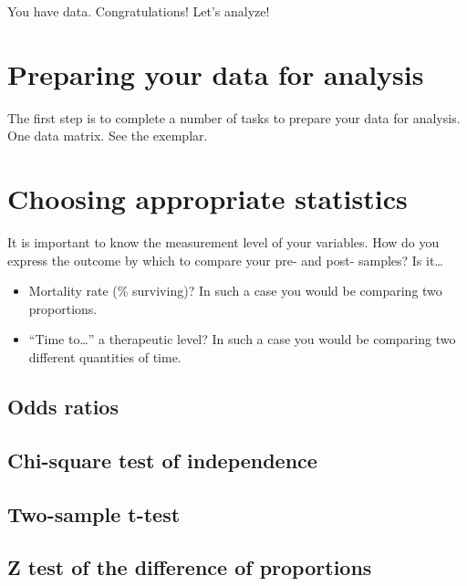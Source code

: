 \documentclass[
]{report}
\providecommand{\tightlist}{%
  \setlength{\itemsep}{0pt}\setlength{\parskip}{0pt}}
\begin{document}
You have data. Congratulations! Let's analyze!

\hypertarget{preparing-your-data-for-analysis}{%
\section{Preparing your data for
analysis}\label{preparing-your-data-for-analysis}}

The first step is to complete a number of tasks to prepare your data for
analysis. One data matrix. See the exemplar.

\hypertarget{choosing-appropriate-statistics}{%
\section{Choosing appropriate
statistics}\label{choosing-appropriate-statistics}}

It is important to know the measurement level of your variables. How do
you express the outcome by which to compare your pre- and post- samples?
Is it\ldots{}

\begin{itemize}
\tightlist
\item
  Mortality rate (\% surviving)? In such a case you would be comparing
  two proportions.
\item
  ``Time to\ldots{}'' a therapeutic level? In such a case you would be
  comparing two different quantities of time.
\end{itemize}

\hypertarget{odds-ratios}{%
\subsection{Odds ratios}\label{odds-ratios}}

\hypertarget{chi-square-test-of-independence}{%
\subsection{Chi-square test of
independence}\label{chi-square-test-of-independence}}

\hypertarget{two-sample-t-test}{%
\subsection{Two-sample t-test}\label{two-sample-t-test}}

\hypertarget{z-test-of-the-difference-of-proportions}{%
\subsection{Z test of the difference of
proportions}\label{z-test-of-the-difference-of-proportions}}
\end{document}
